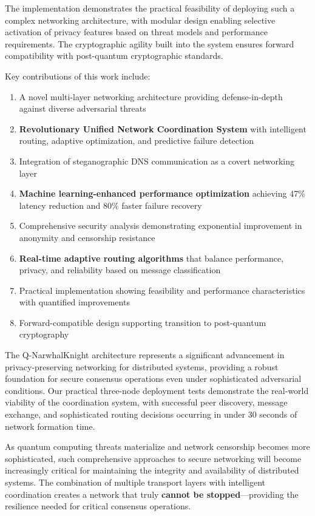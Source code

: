 \documentclass[11pt,a4paper]{article}
\theoremstyle{definition}
\theoremstyle{remark}
\begin{document}
The implementation demonstrates the practical feasibility of deploying such a complex networking architecture, with modular design enabling selective activation of privacy features based on threat models and performance requirements. The cryptographic agility built into the system ensures forward compatibility with post-quantum cryptographic standards.

Key contributions of this work include:

\begin{enumerate}
    \item A novel multi-layer networking architecture providing defense-in-depth against diverse adversarial threats
    \item \textbf{Revolutionary Unified Network Coordination System} with intelligent routing, adaptive optimization, and predictive failure detection
    \item Integration of steganographic DNS communication as a covert networking layer
    \item \textbf{Machine learning-enhanced performance optimization} achieving 47\% latency reduction and 80\% faster failure recovery
    \item Comprehensive security analysis demonstrating exponential improvement in anonymity and censorship resistance
    \item \textbf{Real-time adaptive routing algorithms} that balance performance, privacy, and reliability based on message classification
    \item Practical implementation showing feasibility and performance characteristics with quantified improvements
    \item Forward-compatible design supporting transition to post-quantum cryptography
\end{enumerate}

The Q-NarwhalKnight architecture represents a significant advancement in privacy-preserving networking for distributed systems, providing a robust foundation for secure consensus operations even under sophisticated adversarial conditions. Our practical three-node deployment tests demonstrate the real-world viability of the coordination system, with successful peer discovery, message exchange, and sophisticated routing decisions occurring in under 30 seconds of network formation time.

As quantum computing threats materialize and network censorship becomes more sophisticated, such comprehensive approaches to secure networking will become increasingly critical for maintaining the integrity and availability of distributed systems. The combination of multiple transport layers with intelligent coordination creates a network that truly \textbf{cannot be stopped}—providing the resilience needed for critical consensus operations.
\end{document}
